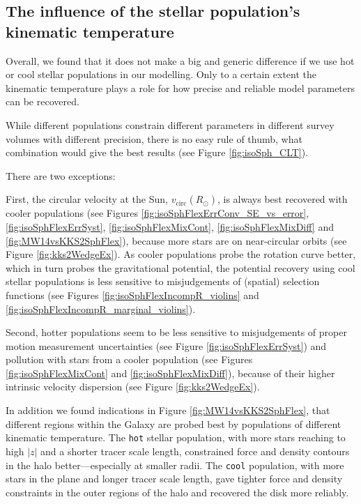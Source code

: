 \subsection{The influence of the stellar population's kinematic temperature} \label{sec:results_temperature}

Overall, we found that it does not make a big and generic difference if we use hot or cool stellar populations in our modelling. Only to a certain extent the kinematic temperature plays a role for how precise and reliable model parameters can be recovered. 

While different populations constrain different parameters in different survey volumes with different precision, there is no easy rule of thumb, what combination would give the best results (see Figure \ref{fig:isoSph_CLT}).

There are two exceptions: 

First, the circular velocity at the Sun, $v_\text{circ}(R_\odot)$, is always best recovered with cooler populations (see Figures \ref{fig:isoSphFlexErrConv_SE_vs_error}, \ref{fig:isoSphFlexErrSyst}, \ref{fig:isoSphFlexMixCont}, \ref{fig:isoSphFlexMixDiff} and \ref{fig:MW14vsKKS2SphFlex}), because more stars are on near-circular orbits (see Figure \ref{fig:kks2WedgeEx}). As cooler populations probe the rotation curve better, which in turn probes the gravitational potential, the potential recovery using cool stellar populations is less sensitive to misjudgements of (spatial) selection functions (see Figures \ref{fig:isoSphFlexIncompR_violins} and \ref{fig:isoSphFlexIncompR_marginal_violins}).

Second, hotter populations seem to be less sensitive to misjudgements of proper motion measurement uncertainties (see Figure \ref{fig:isoSphFlexErrSyst}) and pollution with stars from a cooler population (see Figures \ref{fig:isoSphFlexMixCont} and \ref{fig:isoSphFlexMixDiff}), because of their higher intrinsic velocity dispersion (see Figure \ref{fig:kks2WedgeEx}).

In addition we found indications in Figure \ref{fig:MW14vsKKS2SphFlex}, that different regions within the Galaxy are probed best by populations of different kinematic temperature. The \texttt{hot} stellar population, with more stars reaching to high $|z|$ and a shorter tracer scale length, constrained force and density contours in the halo better---especially at smaller radii. The \texttt{cool} population, with more stars in the plane and longer tracer scale length, gave tighter force and density constraints in the outer regions of the halo and recovered the disk more reliably.